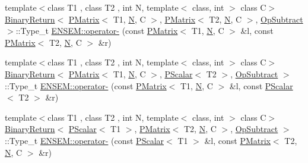 \begin{DoxyCompactItemize}
\item 
{\footnotesize template$<$class T1 , class T2 , int N, template$<$ class, int $>$ class C$>$ }\\\mbox{\hyperlink{structENSEM_1_1BinaryReturn}{Binary\+Return}}$<$ \mbox{\hyperlink{classENSEM_1_1PMatrix}{P\+Matrix}}$<$ T1, \mbox{\hyperlink{operator__name__util_8cc_a7722c8ecbb62d99aee7ce68b1752f337}{N}}, C $>$, \mbox{\hyperlink{classENSEM_1_1PMatrix}{P\+Matrix}}$<$ T2, \mbox{\hyperlink{operator__name__util_8cc_a7722c8ecbb62d99aee7ce68b1752f337}{N}}, C $>$, \mbox{\hyperlink{structENSEM_1_1OpSubtract}{Op\+Subtract}} $>$\+::Type\+\_\+t \mbox{\hyperlink{group__primmatrix_ga2f9d8cfed40f93d8bfffe86a9255ed52}{E\+N\+S\+E\+M\+::operator-\/}} (const \mbox{\hyperlink{classENSEM_1_1PMatrix}{P\+Matrix}}$<$ T1, \mbox{\hyperlink{operator__name__util_8cc_a7722c8ecbb62d99aee7ce68b1752f337}{N}}, C $>$ \&l, const \mbox{\hyperlink{classENSEM_1_1PMatrix}{P\+Matrix}}$<$ T2, \mbox{\hyperlink{operator__name__util_8cc_a7722c8ecbb62d99aee7ce68b1752f337}{N}}, C $>$ \&r)
\item 
{\footnotesize template$<$class T1 , class T2 , int N, template$<$ class, int $>$ class C$>$ }\\\mbox{\hyperlink{structENSEM_1_1BinaryReturn}{Binary\+Return}}$<$ \mbox{\hyperlink{classENSEM_1_1PMatrix}{P\+Matrix}}$<$ T1, \mbox{\hyperlink{operator__name__util_8cc_a7722c8ecbb62d99aee7ce68b1752f337}{N}}, C $>$, \mbox{\hyperlink{classENSEM_1_1PScalar}{P\+Scalar}}$<$ T2 $>$, \mbox{\hyperlink{structENSEM_1_1OpSubtract}{Op\+Subtract}} $>$\+::Type\+\_\+t \mbox{\hyperlink{group__primmatrix_gaa44a21f7776bb8fe8502a30e74d88e3f}{E\+N\+S\+E\+M\+::operator-\/}} (const \mbox{\hyperlink{classENSEM_1_1PMatrix}{P\+Matrix}}$<$ T1, \mbox{\hyperlink{operator__name__util_8cc_a7722c8ecbb62d99aee7ce68b1752f337}{N}}, C $>$ \&l, const \mbox{\hyperlink{classENSEM_1_1PScalar}{P\+Scalar}}$<$ T2 $>$ \&r)
\item 
{\footnotesize template$<$class T1 , class T2 , int N, template$<$ class, int $>$ class C$>$ }\\\mbox{\hyperlink{structENSEM_1_1BinaryReturn}{Binary\+Return}}$<$ \mbox{\hyperlink{classENSEM_1_1PScalar}{P\+Scalar}}$<$ T1 $>$, \mbox{\hyperlink{classENSEM_1_1PMatrix}{P\+Matrix}}$<$ T2, \mbox{\hyperlink{operator__name__util_8cc_a7722c8ecbb62d99aee7ce68b1752f337}{N}}, C $>$, \mbox{\hyperlink{structENSEM_1_1OpSubtract}{Op\+Subtract}} $>$\+::Type\+\_\+t \mbox{\hyperlink{group__primmatrix_ga6f60741d61098ca196a5f733f86a5835}{E\+N\+S\+E\+M\+::operator-\/}} (const \mbox{\hyperlink{classENSEM_1_1PScalar}{P\+Scalar}}$<$ T1 $>$ \&l, const \mbox{\hyperlink{classENSEM_1_1PMatrix}{P\+Matrix}}$<$ T2, \mbox{\hyperlink{operator__name__util_8cc_a7722c8ecbb62d99aee7ce68b1752f337}{N}}, C $>$ \&r)

\end{DoxyCompactItemize}
